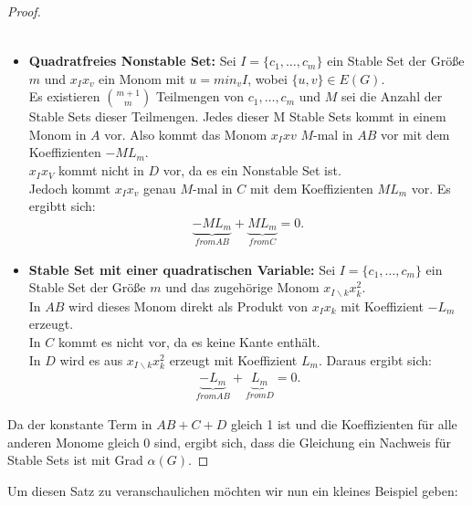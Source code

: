 \begin{proof}
\begin{itemize}
\begin{align*}
\end{align*}
\item \textbf{Quadratfreies Nonstable Set:} Sei $I=\{c_1,\ldots,c_m\}$ ein Stable Set der Größe $m$ und $x_Ix_v$ ein Monom mit $u=min_vI$, wobei $\{u,v\} \in E(G)$. \\
Es existieren $\binom{m+1}{m}$ Teilmengen von ${c_1,\ldots,c_m}$ und $M$ sei die Anzahl der Stable Sets dieser Teilmengen. Jedes dieser M Stable Sets kommt in einem Monom in $A$ vor. Also kommt das Monom $x_Ixv$ $M$-mal in \textbf{$AB$} vor mit dem Koeffizienten $-ML_m$.\\
$x_Ix_V$ kommt nicht in \textbf{$D$} vor, da es ein Nonstable Set ist.\\
Jedoch kommt $x_Ix_v$ genau $M$-mal  in \textbf{$C$} mit dem Koeffizienten $ML_m$ vor. Es ergibtt sich:
\begin{align*}
\underbrace{-ML_m}_{from AB} + \underbrace{ML_m}_{from C} = 0. 
\end{align*}
\item \textbf{Stable Set mit einer quadratischen Variable:} Sei $I=\{c_1,\ldots,c_m\}$ ein Stable Set der Größe $m$ und das zugehörige Monom $x_{I\backslash k}x_k^2$.\\
In \textbf{$AB$} wird dieses Monom direkt als Produkt von $x_Ix_k$ mit Koeffizient $-L_m$ erzeugt.\\
In \textbf{$C$} kommt es nicht vor, da es keine Kante enthält.\\
In \textbf{$D$} wird es aus $x_{I\backslash k}x_k^2$ erzeugt mit Koeffizient $L_m$. Daraus ergibt sich:
\begin{align*}
\underbrace{-L_m}_{from AB} + \underbrace{L_m}_{from D} = 0.
\end{align*}
\end{itemize}
Da der konstante Term in $AB+C+D$ gleich 1 ist und die Koeffizienten für alle anderen Monome gleich 0 sind, ergibt sich, dass die Gleichung ein Nachweis für Stable Sets ist mit Grad $\alpha(G)$.
\end{proof}

\noindent Um diesen Satz zu veranschaulichen möchten wir nun ein kleines Beispiel geben:

